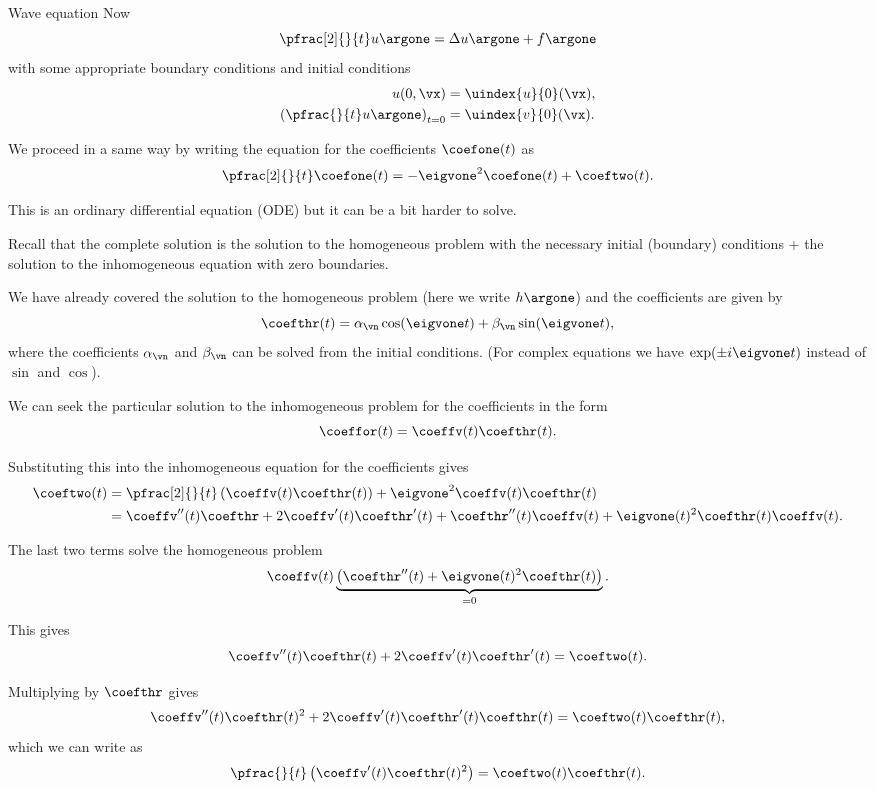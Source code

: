 \begin{frame}{Wave equation}
	Now 
	\[ \pfrac[2]{}{t} u\argone = \Delta u\argone + f\argone \]
	with some appropriate boundary conditions and initial conditions
	\begin{align*}
		u(0,\vx) &= \uindex{u}{0}(\vx), \\
		\left( \pfrac{}{t} u\argone \right)_{t=0} &=  \uindex{v}{0}(\vx).
	\end{align*}

	\pause
	We proceed in a same way by writing the equation for the coefficients $ \coefone(t) $ as
	\[ \pfrac[2]{}{t} \coefone(t) = -\eigvone^2 \coefone(t) + \coeftwo (t). \]
	
	\pause
	This is an ordinary differential equation (ODE) but it can be a bit harder to solve.
\end{frame}

\begin{frame}
	Recall that the complete solution is the solution to the homogeneous problem with the necessary initial (boundary) conditions + the solution to the inhomogeneous equation with zero boundaries. 
	
	\pause
	We have already covered the solution to the homogeneous problem (here we write $ h\argone $) and the coefficients are given by
	\[ \coefthr(t) = \alpha_{\vn} \cos(\eigvone t ) + \beta_{\vn} \sin(\eigvone t), \]
	where the coefficients $ \alpha_{\vn} $ and $ \beta_{\vn} $ can be solved from the initial conditions. (For complex equations we have $ \exp(\pm i\eigvone t) $ instead of $ \sin $ and $ \cos $).
	
	\pause
	We can seek the particular solution to the inhomogeneous problem for the coefficients in the form 
	\[ \coeffor(t) = \coeffv (t) \coefthr (t). \]
\end{frame}

\begin{frame}
	Substituting this into the inhomogeneous equation for the coefficients gives 
	\[  
	\begin{split}
		\coeftwo(t) &= 
		\pfrac[2]{}{t} \left(
		\coeffv (t) \coefthr (t)
		\right) + \eigvone^2 \coeffv (t) \coefthr (t) \\
		&= \coeffv''(t) \coefthr + 2 \coeffv'(t) \coefthr'(t) + \coefthr''(t) \coeffv(t) + \eigvone(t)^2 \coefthr(t) \coeffv(t).
	\end{split}
	\]
	
	\pause
	The last two terms solve the homogeneous problem 
	\[ \coeffv(t) \underbrace{\left( \coefthr''(t)  + \eigvone(t)^2 \coefthr(t) \right)}_{=0}. \]
	
	\pause
	This gives 
	\[ \coeffv''(t) \coefthr(t) + 2 \coeffv'(t) \coefthr'(t) = \coeftwo (t). \]
	
	\pause
	Multiplying by $ \coefthr  $ gives 
	\[ \coeffv''(t) \coefthr(t)^2 + 2 \coeffv'(t) \coefthr'(t)\coefthr(t) = \coeftwo (t)\coefthr(t), \]
	which we can write as
	\[ \pfrac{}{t} \left( \coeffv'(t)  \coefthr(t)^2 \right) = \coeftwo (t)\coefthr(t). \]
	
\end{frame}

